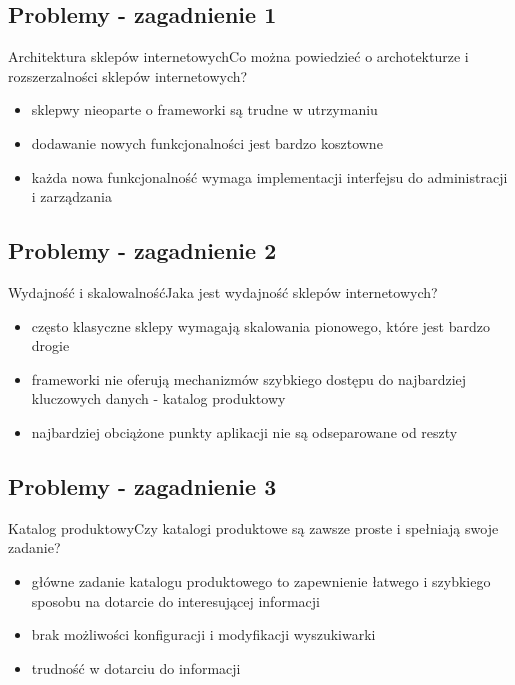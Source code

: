 \documentclass[polish,xcolor=table,9pt,aspectratio=1610,hyperref={pdfpagemode=FullScreen}]{beamer}
\begin{document}
\subsection{Problemy - zagadnienie 1}

\begin{frame}{Architektura sklepów internetowych}{Co można powiedzieć o archotekturze i rozszerzalności sklepów internetowych?}
\begin{itemize}
\item<1-> sklepwy nieoparte o frameworki są trudne w utrzymaniu %
\item<2-> dodawanie nowych funkcjonalności jest bardzo kosztowne  %
\item<2-> każda nowa funkcjonalność wymaga implementacji interfejsu do administracji i zarządzania
\end{itemize}
\end{frame}

\subsection{Problemy - zagadnienie 2}

\begin{frame}{Wydajność i skalowalność}{Jaka jest wydajność sklepów internetowych?}
	\begin{itemize}
		\item<1-> często klasyczne sklepy wymagają skalowania pionowego, które jest bardzo drogie
		\item<2-> frameworki nie oferują mechanizmów szybkiego dostępu do najbardziej kluczowych danych - katalog produktowy %
		\item<3-> najbardziej obciążone punkty aplikacji nie są odseparowane od reszty 
	\end{itemize}
\end{frame}

\subsection{Problemy - zagadnienie 3}

\begin{frame}{Katalog produktowy}{Czy katalogi produktowe są zawsze proste i spełniają swoje zadanie?}
	\begin{itemize}
		\item<1-> główne zadanie katalogu produktowego to zapewnienie łatwego i szybkiego sposobu na dotarcie do interesującej informacji
		\item<2-> brak możliwości konfiguracji i modyfikacji wyszukiwarki %
		\item<3-> trudność w dotarciu do informacji
	\end{itemize}
\end{frame}
\end{document}
